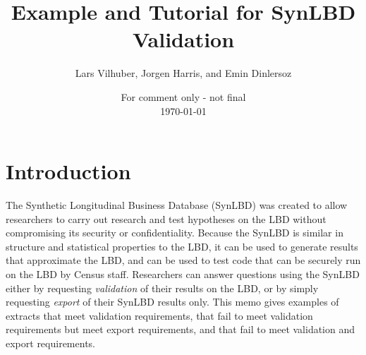 \documentclass{article}
\title{Example and Tutorial for SynLBD Validation}
\author{Lars Vilhuber, Jorgen Harris, and Emin Dinlersoz}
\date{For comment only - not final\\\today}
\begin{document}
\maketitle
\section{Introduction}
The Synthetic Longitudinal Business Database (SynLBD) was created to allow researchers to carry out research and test hypotheses on the LBD without compromising its security or confidentiality.  Because the SynLBD is similar in structure and statistical properties to the LBD, it can be used to generate results that approximate the LBD, and can be used to test code that can be securely run on the LBD by Census staff.  Researchers can answer questions using the SynLBD either by requesting \textit{validation} of their results on the LBD, or by simply requesting \textit{export} of their SynLBD results only. This memo gives examples of extracts that meet validation requirements, that fail to meet validation requirements but meet export requirements, and that fail to meet validation and export requirements.
\end{document}
